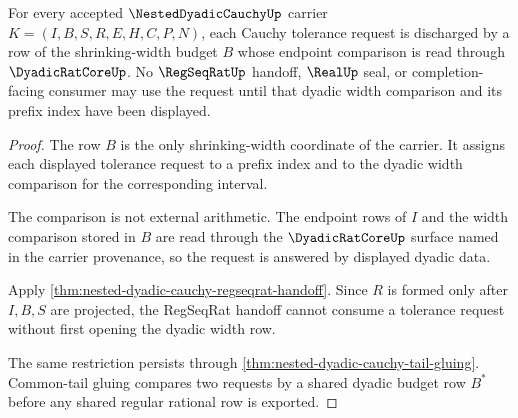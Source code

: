 \begin{theorem}
\label{thm:nested-dyadic-cauchy-obligation-width}
For every accepted $\NestedDyadicCauchyUp$ carrier $K=(I,B,S,R,E,H,C,P,N)$, each Cauchy tolerance request is discharged by a row of the shrinking-width budget $B$ whose endpoint comparison is read through $\DyadicRatCoreUp$. No $\RegSeqRatUp$ handoff, $\RealUp$ seal, or completion-facing consumer may use the request until that dyadic width comparison and its prefix index have been displayed.
\end{theorem}
\begin{proof}
The row $B$ is the only shrinking-width coordinate of the carrier. It assigns each displayed tolerance request to a prefix index and to the dyadic width comparison for the corresponding interval.

The comparison is not external arithmetic. The endpoint rows of $I$ and the width comparison stored in $B$ are read through the $\DyadicRatCoreUp$ surface named in the carrier provenance, so the request is answered by displayed dyadic data.

Apply \autoref{thm:nested-dyadic-cauchy-regseqrat-handoff}. Since $R$ is formed only after $I,B,S$ are projected, the RegSeqRat handoff cannot consume a tolerance request without first opening the dyadic width row.

The same restriction persists through \autoref{thm:nested-dyadic-cauchy-tail-gluing}. Common-tail gluing compares two requests by a shared dyadic budget row $B^*$ before any shared regular rational row is exported.
\end{proof}

